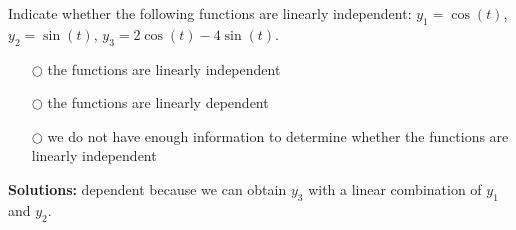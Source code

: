 \ifnum {}
\question[1] Indicate whether the following functions are linearly independent: $y_1 = \cos(t)$, $y_2 = \sin(t)$, $y_3 = 2\cos(t) - 4 \sin(t)$. 
\begin{itemize}
    \item[$\bigcirc$] the functions are linearly independent
    \item[$\bigcirc$] the functions are linearly dependent
    \item[$\bigcirc$] we do not have enough information to determine whether the functions are linearly independent    
\end{itemize}
\ifnum {} {\color{DarkBlue} 
\textbf{Solutions:} dependent because we can obtain $y_3$ with a linear combination of $y_1$ and $y_2$.
} 
\else 
\fi
\fi